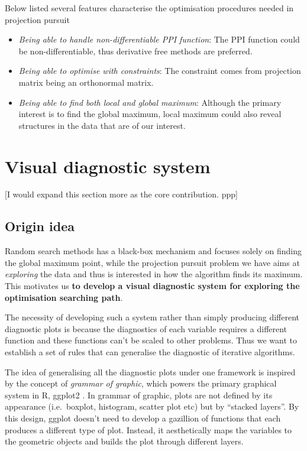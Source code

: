 \documentclass[12pt]{article}
\begin{document}
\newpage

Below listed several features characterise the optimisation procedures
needed in projection pursuit

\begin{itemize}
\item
  \emph{Being able to handle non-differentiable PPI function}: The PPI
  function could be non-differentiable, thus derivative free methods are
  preferred.
\item
  \emph{Being able to optimise with constraints}: The constraint comes
  from projection matrix being an orthonormal matrix.
\item
  \emph{Being able to find both local and global maximum}: Although the
  primary interest is to find the global maximum, local maximum could
  also reveal structures in the data that are of our interest.
\end{itemize}

\hypertarget{vis-diag}{%
\section{Visual diagnostic system}\label{vis-diag}}

{[}I would expand this section more as the core contribution. ppp{]}

\hypertarget{origin-idea}{%
\subsection{Origin idea}\label{origin-idea}}

Random search methods has a black-box mechanism and focuses solely on
finding the global maximum point, while the projection pursuit problem
we have aims at \emph{exploring} the data and thus is interested in how
the algorithm finds its maximum. This motivates us \textbf{to develop a
visual diagnostic system for exploring the optimisation searching path}.

The necessity of developing such a system rather than simply producing
different diagnostic plots is because the diagnostics of each variable
requires a different function and these functions can't be scaled to
other problems. Thus we want to establish a set of rules that can
generalise the diagnostic of iterative algorithms.

The idea of generalising all the diagnostic plots under one framework is
inspired by the concept of \emph{grammar of
graphic}\citep{wickham2010layered}, which powers the primary graphical
system in R, ggplot2 \citep{ggplot2}. In grammar of graphic, plots are
not defined by its appearance (i.e.~boxplot, histogram, scatter plot
etc) but by ``stacked layers''. By this design, ggplot doesn't need to
develop a gazillion of functions that each produces a different type of
plot. Instead, it aesthetically maps the variables to the geometric
objects and builds the plot through different layers.
\end{document}
